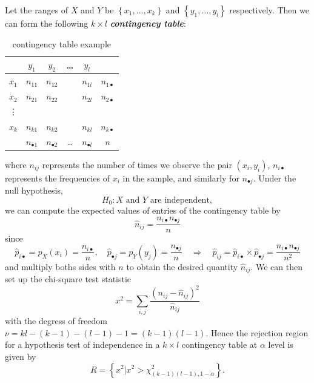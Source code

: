 \documentclass[12pt]{report}
\theoremstyle{definition}
\begin{document}
\bigskip
Let the ranges of $X$ and $Y$ be $\left\{x_1,\ldots,x_k\right\}$ and
$\left\{y_1,\ldots,y_l\right\}$ respectively.
Then we can form the following $k\times l$ \textbf{\emph{contingency table}}:
\begin{table}[h]
    \centering
    \caption{contingency table example}
    \label{contingency_table}
    \begin{tabular}{l|cccc|c}
        & $y_1$ & $y_2$ & \ldots & $y_l$ & \\
        \hline
        $x_1$ & $n_{11}$ & $n_{12}$ &   & $n_{1l}$ & $n_{1\bullet}$ \\
        $x_2$ & $n_{21}$ & $n_{22}$ &   & $n_{2l}$ & $n_{2\bullet}$ \\
        \vdots & & & & & \\
        $x_k$ & $n_{k1}$ & $n_{k 2}$ &   & $n_{kl}$ & $n_{k\bullet}$ \\
        \hline
              & $n_{\bullet 1}$ & $n_{\bullet 2}$ & \ldots & $n_{\bullet l}$ & $n$
    \end{tabular} 
\end{table} 

where $n_{ij}$ represents the number of times we observe the pair $(x_i,y_i)$,
$n_{i\bullet}$ represents the frequencies of $x_i$ in the sample, and similarly
for $n_{\bullet j}$. Under the null hypothesis,
\[
    H_0:\text{$X$ and $Y$ are independent},
\]
we can compute the expected values of entries of the contingency table by
\[
    \hat{n}_{ij}=\frac{n_{i\bullet}n_{\bullet j}}{n}
\]
since
\[
    \hat{p}_{i\bullet}=p_X(x_i)=\frac{n_{i\bullet}}{n},\quad
    \hat{p}_{\bullet j}=p_Y(y_j)=\frac{n_{\bullet j}}{n}\quad\Longrightarrow\quad
    \hat{p}_{ij}=\hat{p}_{i\bullet}\times \hat{p}_{\bullet j}
    =\frac{n_{i\bullet}n_{\bullet j}}{n^{2}}
\]
and multiply boths sides with $n$ to obtain the desired quantity $\hat{n}_{ij}$.
We can then set up the chi-square test statistic
\[
    x^2=\sum_{i,j}\frac{{(n_{ij}-\hat{n}_{ij})}^{2}}{\hat{n}_{ij}}
\]
with the degress of freedom $\nu=kl-(k-1)-(l-1)-1=(k-1)(l-1)$.
Hence the rejection region for a hypothesis test of independence in a $k\times
l$ contingency table at $\alpha$ level is given by
\[
    R=\left\{x^2|x^2>\chi^2_{(k-1)(l-1),1-\alpha}\right\}.
\]
\end{document}
